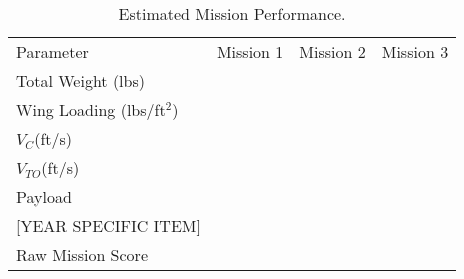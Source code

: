 \begin{table}[h!]
	\centering
	\caption{Estimated Mission Performance.}
	\label{tab:estimatedmissionperformance}
	\begin{tabular}{ C{1.5in}  C{1in}  C{1in}  C{1in}}
		
		Parameter & Mission 1 & Mission 2 & Mission 3 \\
		
		Total Weight (lbs) & & &\\
		
		Wing Loading (lbs/ft\(^2\)) & & &\\
		
		\(V_C\)(ft/s) & & &\\
		
		\(V_{TO}\)(ft/s) & & &\\
		
		Payload & & &\\
		
		{\color{\BYUred} {\color{BYUred} [YEAR SPECIFIC ITEM]}} & & &\\
		
		Raw Mission Score & & &\\
		
	\end{tabular}
\end{table}
